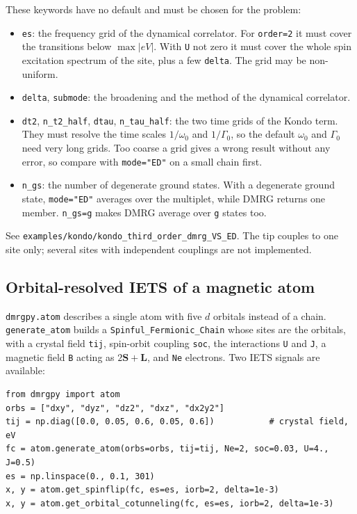 \documentclass[11pt]{article}
\providecommand{\tightlist}{\setlength{\itemsep}{0pt}\setlength{\parskip}{0pt}}
\begin{document}
These keywords have no default and must be chosen for the problem:

\begin{itemize}
\tightlist
\item
  \texttt{es}: the frequency grid of the dynamical correlator. For \texttt{order=2} it
  must cover the transitions below \(\max|eV|\). With \texttt{U} not zero it must
  cover the whole spin excitation spectrum of the site, plus a few
  \texttt{delta}. The grid may be non-uniform.
\item
  \texttt{delta}, \texttt{submode}: the broadening and the method of the dynamical
  correlator.
\item
  \texttt{dt2}, \texttt{n\_\allowbreak{}t2\_\allowbreak{}half}, \texttt{dtau}, \texttt{n\_\allowbreak{}tau\_\allowbreak{}half}: the two time grids of the
  Kondo term. They must resolve the time scales \(1/\omega_0\) and
  \(1/\Gamma_0\), so the default \(\omega_0\) and \(\Gamma_0\) need very long
  grids. Too coarse a grid gives a wrong result without any error, so
  compare with \texttt{mode="ED"} on a small chain first.
\item
  \texttt{n\_\allowbreak{}gs}: the number of degenerate ground states. With a degenerate
  ground state, \texttt{mode="ED"} averages over the multiplet, while DMRG
  returns one member. \texttt{n\_\allowbreak{}gs=g} makes DMRG average over \texttt{g} states too.
\end{itemize}

See \texttt{examples/kondo/kondo\_\allowbreak{}third\_\allowbreak{}order\_\allowbreak{}dmrg\_\allowbreak{}VS\_\allowbreak{}ED}. The tip couples to one
site only; several sites with independent couplings are not implemented.

\subsection{Orbital-resolved IETS of a magnetic atom}

\texttt{dmrgpy.\allowbreak{}atom} describes a single atom with five \(d\) orbitals instead of a
chain. \texttt{generate\_\allowbreak{}atom} builds a \texttt{Spinful\_\allowbreak{}Fermionic\_\allowbreak{}Chain} whose sites are
the orbitals, with a crystal field \texttt{tij}, spin-orbit coupling \texttt{soc}, the
interactions \texttt{U} and \texttt{J}, a magnetic field \texttt{B} acting as
\(2\mathbf S+\mathbf L\), and \texttt{Ne} electrons. Two IETS signals are
available:

\begin{lstlisting}
from dmrgpy import atom
orbs = ["dxy", "dyz", "dz2", "dxz", "dx2y2"]
tij = np.diag([0.0, 0.05, 0.6, 0.05, 0.6])           # crystal field, eV
fc = atom.generate_atom(orbs=orbs, tij=tij, Ne=2, soc=0.03, U=4., J=0.5)
es = np.linspace(0., 0.1, 301)
x, y = atom.get_spinflip(fc, es=es, iorb=2, delta=1e-3)
x, y = atom.get_orbital_cotunneling(fc, es=es, iorb=2, delta=1e-3)
\end{lstlisting}
\end{document}
